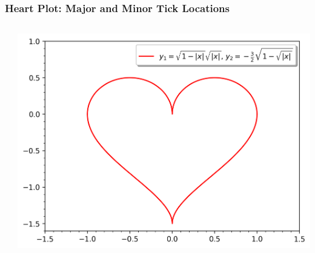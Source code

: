 \documentclass[xcolor={svgnames}]{beamer}
\newcommand{\pyfile}[2][]{}
\begin{document}
\begin{frame}[t,fragile]
    \frametitle{Heart Plot: Major and Minor Tick Locations}
    \vspace{-2mm}
    \begin{columns}[T]
        \begin{column}{0.47\textwidth}
            \pyfile[style=tiny]{examples/heart-2.py}
        \end{column}
        \begin{column}{0.53\textwidth}
            \includegraphics[width=\textwidth]{img/heart-2.png}
        \end{column}
    \end{columns}
\end{frame}
\end{document}

